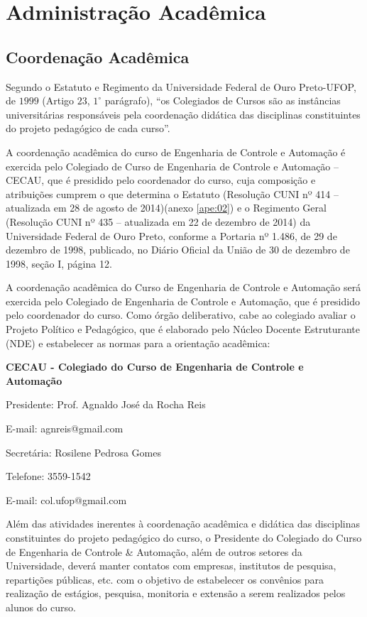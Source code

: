 \chapter{Administra{\c c}{\~a}o Acad{{\^e}mica}}
\label{cap:03} 

\section{Coordenação Acadêmica}
Segundo o Estatuto e Regimento da Universidade Federal de Ouro Preto-UFOP, de $1999$ (Artigo $23$, $ 1^{\circ}$  parágrafo), ``os Colegiados de Cursos são as instâncias universitárias responsáveis pela coordenação didática das disciplinas constituintes do projeto pedagógico de cada curso''.

A coordenação acadêmica do curso de Engenharia de Controle e Automação é exercida pelo Colegiado de Curso de Engenharia de Controle e Automação – CECAU, que é presidido pelo coordenador do curso, cuja composição e atribuições cumprem o que determina o Estatuto (Resolução CUNI nº 414 – atualizada em 28 de agosto de 2014)(anexo \ref{ape:02}) e o Regimento Geral (Resolução CUNI nº 435 – atualizada em 22 de dezembro de 2014) da Universidade Federal de Ouro Preto, conforme a Portaria nº 1.486, de 29 de dezembro de 1998, publicado, no Diário Oficial da União de 30 de dezembro de 1998, seção I, página 12. 

A coordenação acadêmica do Curso de Engenharia de Controle e Automação será exercida pelo Colegiado de Engenharia de Controle e Automação, que é presidido pelo coordenador do curso. Como órgão deliberativo, cabe ao colegiado avaliar o Projeto Político e Pedagógico, que é elaborado pelo Núcleo Docente Estruturante (NDE) e estabelecer as normas para a orientação acadêmica:

\textbf{CECAU - Colegiado do Curso de Engenharia de Controle e Automação}

Presidente: Prof. Agnaldo José da Rocha Reis

E-mail: agnreis@gmail.com

Secretária: Rosilene Pedrosa Gomes

Telefone: 3559-1542

E-mail: col.ufop@gmail.com

Além das atividades inerentes à coordenação acadêmica e didática das disciplinas constituintes do projeto pedagógico do curso, o Presidente do Colegiado do Curso de Engenharia de Controle \& Automação, além de outros setores da Universidade, deverá manter contatos com empresas, institutos de pesquisa, repartições públicas, etc. com o objetivo de estabelecer os convênios para realização de estágios, pesquisa, monitoria e extensão a serem realizados pelos alunos do curso.

